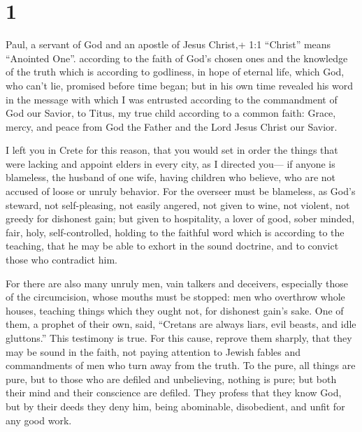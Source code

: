 \hypertarget{section}{%
\section{1}\label{section}}

 Paul, a servant of God and an apostle of Jesus Christ,+ 1:1
``Christ'' means ``Anointed One''. according to the faith of God's
chosen ones and the knowledge of the truth which is according to
godliness,  in hope of eternal life, which God, who can't
lie, promised before time began;  but in his own time
revealed his word in the message with which I was entrusted according to
the commandment of God our Savior,  to Titus, my true child
according to a common faith: Grace, mercy, and peace from God the Father
and the Lord Jesus Christ our Savior.

 I left you in Crete for this reason, that you would set in
order the things that were lacking and appoint elders in every city, as
I directed you---  if anyone is blameless, the husband of
one wife, having children who believe, who are not accused of loose or
unruly behavior.  For the overseer must be blameless, as
God's steward, not self-pleasing, not easily angered, not given to wine,
not violent, not greedy for dishonest gain;  but given to
hospitality, a lover of good, sober minded, fair, holy, self-controlled,
 holding to the faithful word which is according to the
teaching, that he may be able to exhort in the sound doctrine, and to
convict those who contradict him.

 For there are also many unruly men, vain talkers and
deceivers, especially those of the circumcision,  whose
mouths must be stopped: men who overthrow whole houses, teaching things
which they ought not, for dishonest gain's sake.  One of
them, a prophet of their own, said, ``Cretans are always liars, evil
beasts, and idle gluttons.''  This testimony is true. For
this cause, reprove them sharply, that they may be sound in the faith,
 not paying attention to Jewish fables and commandments of
men who turn away from the truth.  To the pure, all things
are pure, but to those who are defiled and unbelieving, nothing is pure;
but both their mind and their conscience are defiled.  They
profess that they know God, but by their deeds they deny him, being
abominable, disobedient, and unfit for any good work.

